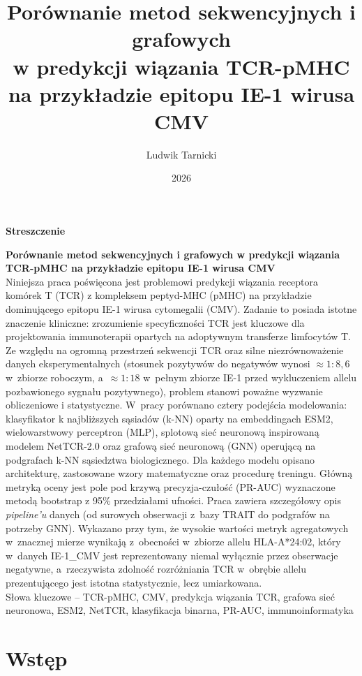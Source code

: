 \documentclass{SGGW-thesis}
\title{Porównanie metod sekwencyjnych i grafowych\\w predykcji wiązania TCR-pMHC\\na przykładzie epitopu IE-1 wirusa CMV}
\author{Ludwik Tarnicki}
\date{2026}
\renewcommand{\abstractpage}[6]{%
    \setstretch{1.4}
    \null
    \vfill
    \begin{center}
        \textbf{Streszczenie}\\
    \end{center}
    \noindent
    \textbf{#1}\\[1.5ex]
    {#2}
    \\[4ex]
    Słowa kluczowe -- {#3}
    \ifthenelse{\equal{#4}{}}{}{%
        \vfill
        \begin{center}
            \textbf{Summary}\\
        \end{center}
        \noindent
        \textbf{#4}\\[1.5ex]
        {\selecthyphenation{english}#5}
        \\[4ex]
        Keywords -- {\selecthyphenation{english}#6}
    }%
    \vfill
    \pagestyle{empty}
    \newpage
    \null
    \pagestyle{empty}
    \newpage
    \pagestyle{plain}
}
\begin{document}
\maketitle
\statementpage
\abstractpage
{Porównanie metod sekwencyjnych i grafowych w predykcji wiązania TCR-pMHC na przykładzie epitopu IE-1 wirusa CMV}
{Niniejsza praca poświęcona jest problemowi predykcji wiązania receptora komórek T (TCR) z kompleksem
peptyd-MHC (pMHC) na przykładzie dominującego epitopu IE-1 wirusa cytomegalii (CMV). Zadanie to
posiada istotne znaczenie kliniczne: zrozumienie specyficzności TCR jest kluczowe dla projektowania
immunoterapii opartych na adoptywnym transferze limfocytów T. Ze względu na ogromną przestrzeń sekwencji
TCR oraz silne niezrównoważenie danych eksperymentalnych (stosunek pozytywów do negatywów wynosi
${\approx}1{:}8{,}6$ w~zbiorze roboczym, a~${\approx}1{:}18$ w~pełnym zbiorze IE-1 przed wykluczeniem
allelu pozbawionego sygnału pozytywnego), problem stanowi poważne wyzwanie obliczeniowe i statystyczne. W~pracy porównano cztery podejścia
modelowania: klasyfikator k najbliższych sąsiadów (k-NN) oparty na embeddingach ESM2, wielowarstwowy
perceptron (MLP), splotową sieć neuronową inspirowaną modelem NetTCR-2.0 oraz grafową sieć neuronową
(GNN) operującą na podgrafach k-NN sąsiedztwa biologicznego. Dla każdego modelu opisano architekturę,
zastosowane wzory matematyczne oraz procedurę treningu. Główną metryką oceny jest pole pod krzywą
precyzja-czułość (PR-AUC) wyznaczone metodą bootstrap z 95\% przedziałami ufności. Praca zawiera
szczegółowy opis \textit{pipeline'u} danych (od surowych obserwacji z~bazy TRAIT do podgrafów na potrzeby GNN). Wykazano przy tym, że wysokie wartości metryk agregatowych
w~znacznej mierze wynikają z~obecności w~zbiorze allelu HLA-A*24:02, który w~danych IE-1\_CMV
jest reprezentowany niemal wyłącznie przez obserwacje negatywne, a~rzeczywista zdolność
rozróżniania TCR w~obrębie allelu prezentującego jest istotna
statystycznie, lecz umiarkowana.}
{TCR-pMHC, CMV, predykcja wiązania TCR, grafowa sieć neuronowa, ESM2, NetTCR, klasyfikacja binarna, PR-AUC, immunoinformatyka}
{}
{}
{}

\tableofcontents

\startchapterfromoddpage

\chapter{Wstęp}
\label{chap:wstep}
\end{document}
